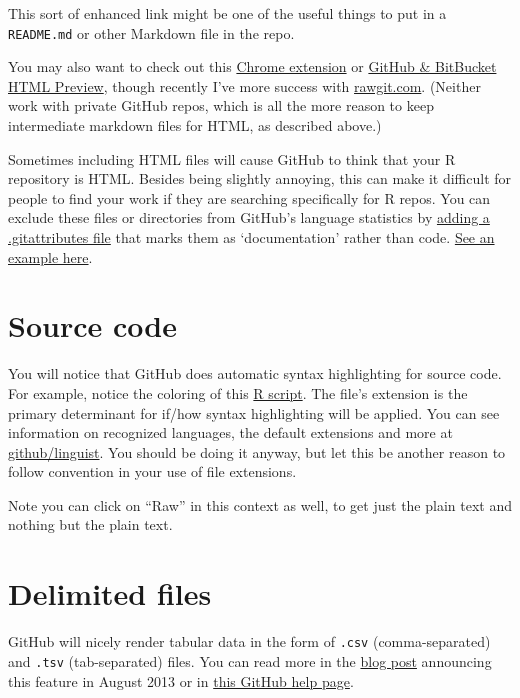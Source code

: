 \documentclass[
]{book}
\begin{document}
This sort of enhanced link might be one of the useful things to put in a \texttt{README.md} or other Markdown file in the repo.

You may also want to check out this \href{https://chrome.google.com/webstore/detail/github-html-preview/cphnnfjainnhgejcpgboeeakfkgbkfek?hl=en}{Chrome extension} or \href{https://htmlpreview.github.io}{GitHub \& BitBucket HTML Preview}, though recently I've more success with \href{http://rawgit.com}{rawgit.com}. (Neither work with private GitHub repos, which is all the more reason
to keep intermediate markdown files for HTML, as described above.)

Sometimes including HTML files will cause GitHub to think that your R repository is HTML. Besides being slightly annoying, this can make it difficult for people to find your work if they are searching specifically for R repos. You can exclude these files or directories from GitHub's language statistics by \href{https://github.com/github/linguist\#using-gitattributes}{adding a .gitattributes file} that marks them as `documentation' rather than code. \href{https://github.com/jennybc/googlesheets/blob/master/.gitattributes}{See an example here}.

\section{Source code}\label{source-code}

You will notice that GitHub does automatic syntax highlighting for source code. For example, notice the coloring of this \href{https://github.com/jennybc/ggplot2-tutorial/blob/master/gapminder-ggplot2-stripplot.r}{R script}. The file's extension is the primary determinant for if/how syntax highlighting will be applied. You can see information on recognized languages, the default extensions and more at \href{https://github.com/github/linguist/blob/master/lib/linguist/languages.yml}{github/linguist}. You should be doing it anyway, but let this be another reason to follow convention in your use of file extensions.

Note you can click on ``Raw'' in this context as well, to get just the plain text and nothing but the plain text.

\section{Delimited files}\label{delimited-files}

GitHub will nicely render tabular data in the form of \texttt{.csv} (comma-separated) and \texttt{.tsv} (tab-separated) files. You can read more in the \href{https://github.com/blog/1601-see-your-csvs}{blog post} announcing this feature in August 2013 or in \href{https://help.github.com/articles/rendering-csv-and-tsv-data}{this GitHub help page}.
\end{document}
